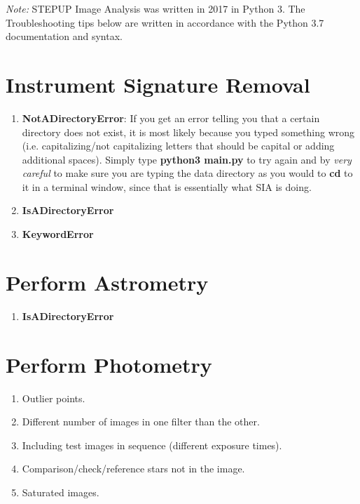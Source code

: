 \documentclass[11pt]{report}
\begin{document}
\emph{Note:} STEPUP Image Analysis was written in 2017 in Python 3. The Troubleshooting tips below are written in accordance with the Python 3.7 documentation and syntax. 

\section{Instrument Signature Removal}
\begin{enumerate}
\item {\bf NotADirectoryError}: If you get an error telling you that a certain directory does not exist, it is most likely because you typed something wrong (i.e. capitalizing/not capitalizing letters that should be capital or adding additional spaces). Simply type {\bf python3 main.py} to try again and by \emph{very careful} to make sure you are typing the data directory as you would to {\bf cd} to it in a terminal window, since that is essentially what SIA is doing.
\item {\bf IsADirectoryError}
\item {\bf KeywordError}
\end{enumerate}
\section{Perform Astrometry}
\begin{enumerate}
\item {\bf IsADirectoryError}
\end{enumerate}
\section{Perform Photometry}
\begin{enumerate}
\item Outlier points.
\item Different number of images in one filter than the other.
\item Including test images in sequence (different exposure times).
\item Comparison/check/reference stars not in the image.
\item Saturated images.
\end{enumerate}

\end{document}
